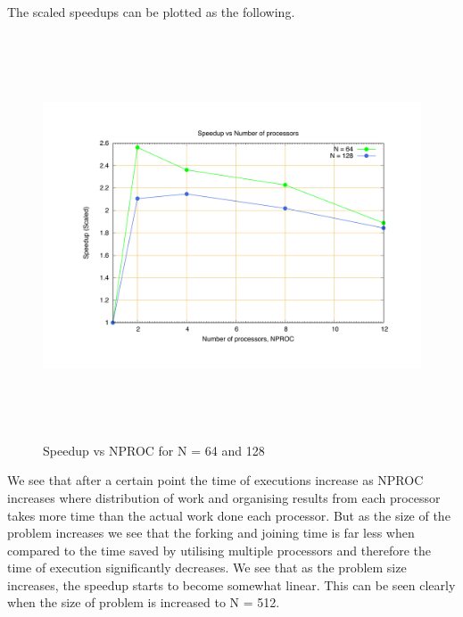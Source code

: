 \documentclass[fleqn,letterpaper,12pt]{report}
\begin{document}
The scaled speedups can be plotted as the following. 
\begin{figure}[htbp]
	\centering
	\includegraphics[height=120mm,width=160mm]{64128smat.pdf}
	\caption{Speedup vs NPROC for N = 64 and 128\label{overflow}}
\end{figure}

We see that after a certain point the time of executions increase as NPROC increases where distribution of work and organising results from each processor takes more time than the actual work done each processor. But as the size of the problem increases we see that the forking and joining time is far less when compared to the time saved by utilising multiple processors and therefore the time of execution significantly decreases.
\newpage
We see that as the problem size increases, the speedup starts to become somewhat linear. This can be seen clearly when the size of problem is increased to N = 512.
\end{document}
